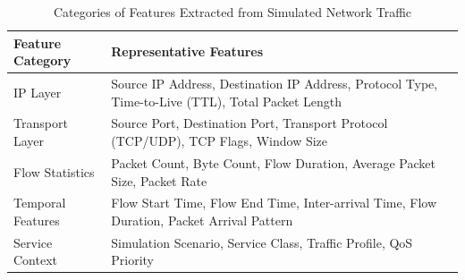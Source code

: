 \documentclass[12pt,a4paper]{report}
\begin{document}

	
	\begin{table}[H]
		\centering
		\caption{Categories of Features Extracted from Simulated Network Traffic}
		\label{tab:features}
		
		\begin{tabular}{|p{4cm}|p{8cm}|}
			\hline
			
			\textbf{Feature Category} &
			\textbf{Representative Features}
			\\
			\hline
			
			IP Layer &
			Source IP Address, Destination IP Address, Protocol Type, Time-to-Live (TTL), Total Packet Length
			\\
			\hline
			
			Transport Layer &
			Source Port, Destination Port, Transport Protocol (TCP/UDP), TCP Flags, Window Size
			\\
			\hline
			
			Flow Statistics &
			Packet Count, Byte Count, Flow Duration, Average Packet Size, Packet Rate
			\\
			\hline
			
			Temporal Features &
			Flow Start Time, Flow End Time, Inter-arrival Time, Flow Duration, Packet Arrival Pattern
			\\
			\hline
			
			Service Context &
			Simulation Scenario, Service Class, Traffic Profile, QoS Priority
			\\
			\hline
			
		\end{tabular}
		
	\end{table}
\end{document}
